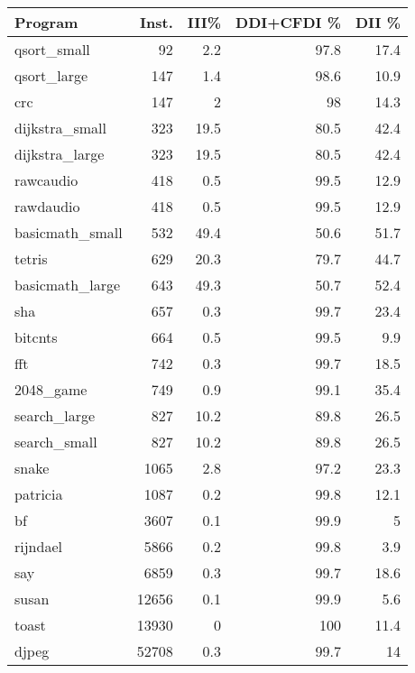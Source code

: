 \begin{tabular}{lrrrr}
\hline
 Program         &   Inst. &   III\% &   DDI+CFDI \% &   DII \% \\
\hline
 qsort\_small     &      92 &    2.2 &         97.8 &    17.4 \\
 qsort\_large     &     147 &    1.4 &         98.6 &    10.9 \\
 crc             &     147 &    2   &         98   &    14.3 \\
 dijkstra\_small  &     323 &   19.5 &         80.5 &    42.4 \\
 dijkstra\_large  &     323 &   19.5 &         80.5 &    42.4 \\
 rawcaudio       &     418 &    0.5 &         99.5 &    12.9 \\
 rawdaudio       &     418 &    0.5 &         99.5 &    12.9 \\
 basicmath\_small &     532 &   49.4 &         50.6 &    51.7 \\
 tetris          &     629 &   20.3 &         79.7 &    44.7 \\
 basicmath\_large &     643 &   49.3 &         50.7 &    52.4 \\
 sha             &     657 &    0.3 &         99.7 &    23.4 \\
 bitcnts         &     664 &    0.5 &         99.5 &     9.9 \\
 fft             &     742 &    0.3 &         99.7 &    18.5 \\
 2048\_game       &     749 &    0.9 &         99.1 &    35.4 \\
 search\_large    &     827 &   10.2 &         89.8 &    26.5 \\
 search\_small    &     827 &   10.2 &         89.8 &    26.5 \\
 snake           &    1065 &    2.8 &         97.2 &    23.3 \\
 patricia        &    1087 &    0.2 &         99.8 &    12.1 \\
 bf              &    3607 &    0.1 &         99.9 &     5   \\
 rijndael        &    5866 &    0.2 &         99.8 &     3.9 \\
 say             &    6859 &    0.3 &         99.7 &    18.6 \\
 susan           &   12656 &    0.1 &         99.9 &     5.6 \\
 toast           &   13930 &    0   &        100   &    11.4 \\
 djpeg           &   52708 &    0.3 &         99.7 &    14   \\

\end{tabular}

